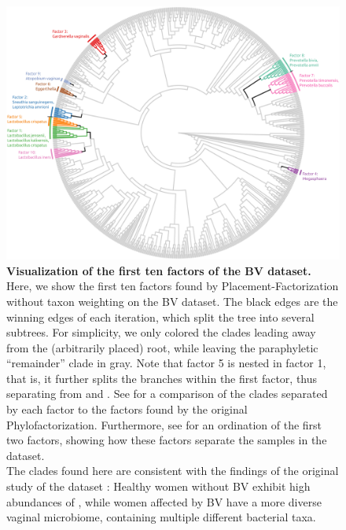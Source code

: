 \begin{figure}[!htbp]
    \centering
     \includegraphics[width=\linewidth]{pdf/factors_tree.pdf}
    \caption{
        \textbf{Visualization of the first ten factors of the BV dataset.}
        Here, we show the first ten factors found by Placement-Factorization without taxon weighting on the \ac{BV} dataset.
        The black edges are the winning edges of each iteration, which split the tree into several subtrees.
        For simplicity, we only colored the clades leading away from the (arbitrarily placed) root,
        while leaving the paraphyletic ``remainder'' clade in gray.
        Note that factor 5 is nested in factor 1, that is, it further splits the branches within the first factor,
        thus separating 
        from  and .
        See  for a comparison of the clades separated by each factor
        to the factors found by the original Phylofactorization.
        Furthermore, see  for an ordination
        of the first two factors, showing how these factors separate the samples in the dataset.
        \\
        The clades found here are consistent with the findings of the original study of the dataset \cite{Srinivasan2012}:
        Healthy women without \ac{BV} exhibit high abundances of ,
        while women affected by \ac{BV} have a more diverse vaginal microbiome,
        containing multiple different bacterial taxa.
}
\end{figure}
